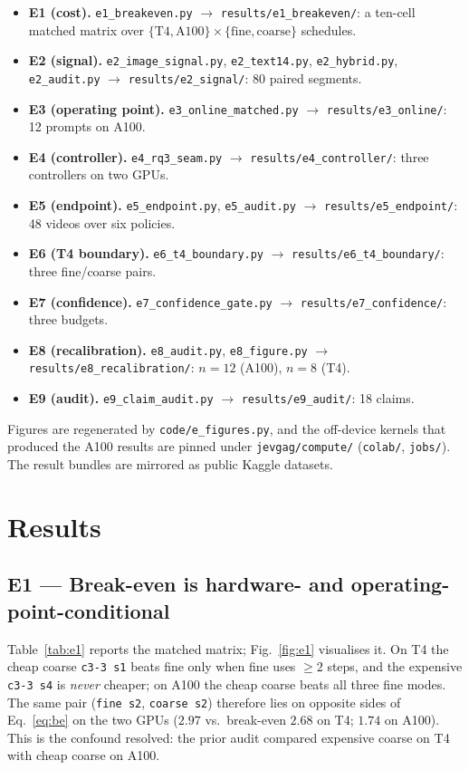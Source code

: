 \documentclass[journal]{IEEEtran}
\begin{document}
\begin{itemize}
  \item \textbf{E1 (cost).} \texttt{e1\_breakeven.py} $\to$ \texttt{results/e1\_breakeven/}: a ten-cell
  matched matrix over $\{\text{T4},\text{A100}\}\times\{\text{fine},\text{coarse}\}$ schedules.
  \item \textbf{E2 (signal).} \texttt{e2\_image\_signal.py}, \texttt{e2\_text14.py}, \texttt{e2\_hybrid.py},
  \texttt{e2\_audit.py} $\to$ \texttt{results/e2\_signal/}: 80 paired segments.
  \item \textbf{E3 (operating point).} \texttt{e3\_online\_matched.py} $\to$ \texttt{results/e3\_online/}:
  12 prompts on A100.
  \item \textbf{E4 (controller).} \texttt{e4\_rq3\_seam.py} $\to$ \texttt{results/e4\_controller/}: three
  controllers on two GPUs.
  \item \textbf{E5 (endpoint).} \texttt{e5\_endpoint.py}, \texttt{e5\_audit.py} $\to$
  \texttt{results/e5\_endpoint/}: 48 videos over six policies.
  \item \textbf{E6 (T4 boundary).} \texttt{e6\_t4\_boundary.py} $\to$ \texttt{results/e6\_t4\_boundary/}:
  three fine/coarse pairs.
  \item \textbf{E7 (confidence).} \texttt{e7\_confidence\_gate.py} $\to$ \texttt{results/e7\_confidence/}:
  three budgets.
  \item \textbf{E8 (recalibration).} \texttt{e8\_audit.py}, \texttt{e8\_figure.py} $\to$
  \texttt{results/e8\_recalibration/}: $n{=}12$ (A100), $n{=}8$ (T4).
  \item \textbf{E9 (audit).} \texttt{e9\_claim\_audit.py} $\to$ \texttt{results/e9\_audit/}: 18 claims.
\end{itemize}

Figures are regenerated by \texttt{code/e\_figures.py}, and the off-device kernels that produced the A100
results are pinned under \texttt{jevgag/compute/} (\texttt{colab/}, \texttt{jobs/}). The result bundles are
mirrored as public Kaggle datasets.

\section{Results}

\subsection{E1 --- Break-even is hardware- and operating-point-conditional}
\label{sec:e1}
Table~\ref{tab:e1} reports the matched matrix; Fig.~\ref{fig:e1} visualises it. On T4 the cheap coarse
\texttt{c3-3 s1} beats fine only when fine uses $\ge 2$ steps, and the expensive \texttt{c3-3 s4} is
\emph{never} cheaper; on A100 the cheap coarse beats all three fine modes. The same pair
(\texttt{fine s2}, \texttt{coarse s2}) therefore lies on opposite sides of Eq.~\eqref{eq:be} on the two
GPUs ($2.97$ vs.\ break-even $2.68$ on T4; $1.74$ on A100). This is the confound resolved: the prior
audit compared expensive coarse on T4 with cheap coarse on A100.
\end{document}
